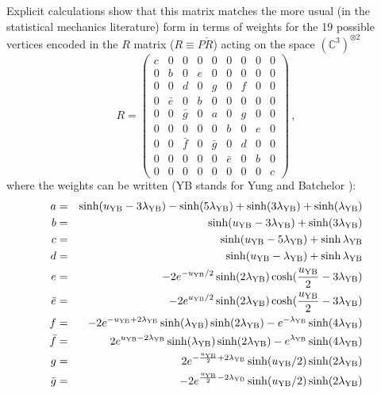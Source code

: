 \documentclass[11pt]{article}
\begin{document}
Explicit calculations show that this matrix matches the more usual (in the statistical mechanics literature) form \cite{Batchelori} in terms of weights for the 19 possible vertices encoded in the $R$ matrix ($R\equiv P\check{R}$) acting on the space
$(\mathbb{C}^3)^{\otimes 2}$
%
\begin{equation}
R=\left(\begin{array}{ccc|ccc|ccc}
c&0&0&0&0&0&0&0&0\\
0&b&0&e&0&0&0&0&0\\
0&0&d&0&g&0&f&0&0\\ \hline
0&\bar{e}&0&b&0&0&0&0&0\\
0&0&\bar{g}&0&a&0&g&0&0\\
0&0&0&0&0&b&0&e&0\\ \hline
0&0&\bar{f}&0&\bar{g}&0&d&0&0\\
0&0&0&0&0&\bar{e}&0&b&0\\
0&0&0&0&0&0&0&0&c
\end{array}\right) \,,
\label{19vRmatrix}
\end{equation}
%
where the weights can be written (YB stands for Yung and Batchelor \cite{Batchelori}):
%
\begin{eqnarray}
a&=&\sinh(u_{\rm YB}-3\lambda_{\rm YB})-\sinh(5\lambda_{\rm YB})+\sinh(3\lambda_{\rm YB})+\sinh(\lambda_{\rm YB})\nonumber\\
b&=&\sinh(u_{\rm YB}-3\lambda_{\rm YB})+\sinh(3\lambda_{\rm YB})\nonumber\\
c&=&\sinh(u_{\rm YB}-5\lambda_{\rm YB})+\sinh\lambda_{\rm YB}\nonumber\\
d&=&\sinh(u_{\rm YB}-\lambda_{\rm YB})+\sinh\lambda_{\rm YB}\nonumber\\
e&=&-2e^{-u_{\rm YB}/2}\sinh(2\lambda_{\rm YB})\cosh({u_{\rm YB}\over2}-3\lambda_{\rm YB})\nonumber\\
\bar{e}&=&-2e^{u_{\rm YB}/2}\sinh(2\lambda_{\rm YB})\cosh({u_{\rm YB}\over2}-3\lambda_{\rm YB})\nonumber\\
f&=&-2e^{-u_{\rm YB}+2\lambda_{\rm YB}}\sinh(\lambda_{\rm YB})\sinh(2\lambda_{\rm YB})-e^{-\lambda_{\rm YB}}\sinh(4\lambda_{\rm YB})\nonumber\\
\bar{f}&=&2e^{u_{\rm YB}-2\lambda_{\rm YB}}\sinh(\lambda_{\rm YB})\sinh(2\lambda_{\rm YB})-e^{\lambda_{\rm YB}}\sinh(4\lambda_{\rm YB})\nonumber\\
g&=&2e^{-{u_{\rm YB}\over 2}+2\lambda_{\rm YB}}\sinh(u_{\rm YB}/2)\sinh(2\lambda_{\rm YB})\nonumber\\
\bar{g}&=&-2e^{{u_{\rm YB}\over 2}-2\lambda_{\rm YB}}\sinh(u_{\rm YB}/2)\sinh(2\lambda_{\rm YB})
\end{eqnarray}
\end{document}
